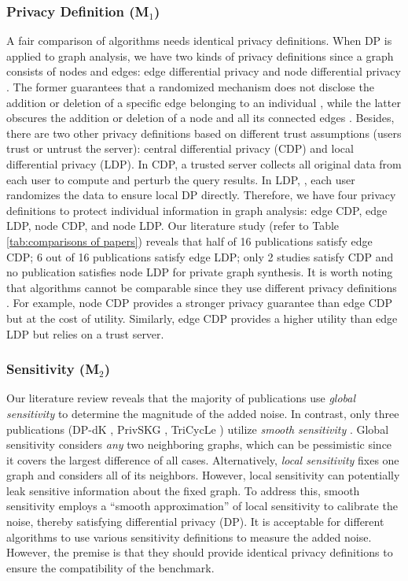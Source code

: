 \documentclass[conference]{IEEEtran}
\theoremstyle{plain}
\begin{document}
\subsubsection{Privacy Definition (\textbf{M$_1$})}
A fair comparison of algorithms needs identical privacy definitions.
When DP is applied to graph analysis, we have two kinds of privacy definitions since a graph consists of nodes and edges: edge differential privacy and node differential privacy \cite{hay2009accurate}.
The former guarantees that a randomized mechanism does not disclose the addition or deletion of a specific edge belonging to an individual \cite{blocki2012johnson}, while the latter obscures the addition or deletion of a node and all its connected edges \cite{kasiviswanathan2013analyzing}.
Besides, there are two other privacy definitions based on different trust assumptions (users trust or untrust the server): central differential privacy (CDP) and local differential privacy (LDP).
In CDP\cite{dwork2008differential}, a trusted server collects all original data from each user to compute and perturb the query results.
In LDP, \cite{kasiviswanathan2011can}, each user randomizes the data to ensure local DP directly.
Therefore, we have four privacy definitions to protect individual information in graph analysis: edge CDP, edge LDP, node CDP, and node LDP.
Our literature study (refer to Table \ref{tab:comparisons of papers}) reveals that half of 16 publications satisfy edge CDP;
6 out of 16 publications satisfy edge LDP;
only 2 studies satisfy CDP and no publication satisfies node LDP for private graph synthesis.
It is worth noting that algorithms cannot be comparable since they use different privacy definitions .
For example, node CDP provides a stronger privacy guarantee than edge CDP but at the cost of utility.
Similarly, edge CDP provides a higher utility than edge LDP but relies on a trust server.

\subsubsection{Sensitivity (\textbf{M$_2$})}
Our literature review reveals that the majority of publications use \textit{global sensitivity} \cite{dwork2006calibrating} to determine the magnitude of the added noise. 
In contrast, only three publications (DP-dK \cite{wang2013preserving}, PrivSKG \cite{mir2012differentially}, TriCycLe \cite{jorgensen2016publishing}) utilize \textit{smooth sensitivity} \cite{nissim2007smooth}.
Global sensitivity considers \textit{any} two neighboring graphs, which can be pessimistic since it covers the largest difference of all cases. 
Alternatively, \textit{local sensitivity} \cite{nissim2007smooth} fixes one graph and considers all of its neighbors. 
However, local sensitivity can potentially leak sensitive information about the fixed graph.
To address this, smooth sensitivity employs a “smooth approximation” of local sensitivity to calibrate the noise, thereby satisfying differential privacy (DP). 
It is acceptable for different algorithms to use various sensitivity definitions to measure the added noise. 
However, the premise is that they should provide identical privacy definitions to ensure the compatibility of the benchmark.
\end{document}
